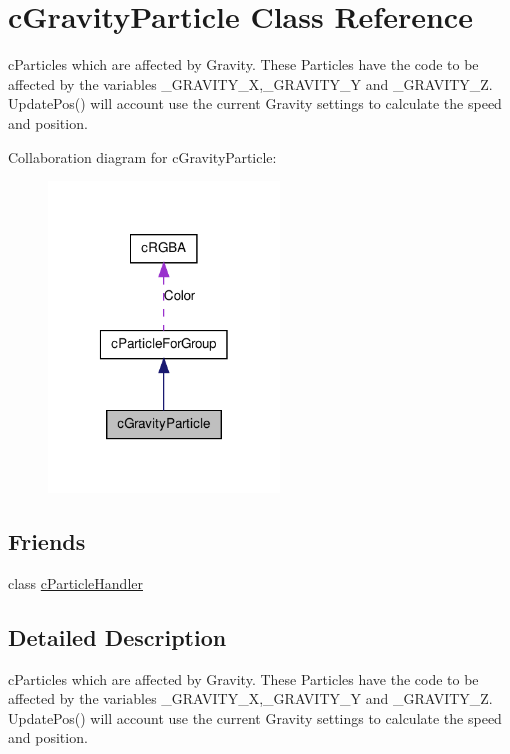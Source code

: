 \hypertarget{classc_gravity_particle}{
\section{cGravityParticle Class Reference}
\label{classc_gravity_particle}
}


cParticles which are affected by Gravity. These Particles have the code to be affected by the variables \_\-GRAVITY\_\-X,\_\-GRAVITY\_\-Y and \_\-GRAVITY\_\-Z. UpdatePos() will account use the current Gravity settings to calculate the speed and position.  




Collaboration diagram for cGravityParticle:\nopagebreak
\begin{figure}[H]
\begin{center}
\leavevmode
\includegraphics[width=174pt]{classc_gravity_particle__coll__graph}
\end{center}
\end{figure}
\subsection*{Friends}
\begin{DoxyCompactItemize}
\item 
\hypertarget{classc_gravity_particle_ad810bc5f0330a0154ffaabe8d256379c}{
class \hyperlink{classc_gravity_particle_ad810bc5f0330a0154ffaabe8d256379c}{cParticleHandler}}
\label{classc_gravity_particle_ad810bc5f0330a0154ffaabe8d256379c}

\end{DoxyCompactItemize}


\subsection{Detailed Description}
cParticles which are affected by Gravity. These Particles have the code to be affected by the variables \_\-GRAVITY\_\-X,\_\-GRAVITY\_\-Y and \_\-GRAVITY\_\-Z. UpdatePos() will account use the current Gravity settings to calculate the speed and position. 